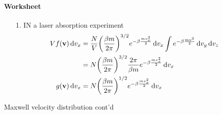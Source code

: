 \documentclass[../main.tex]{subfiles}
\begin{document}
\paragraph{Worksheet}
\begin{enumerate}
    \item [1.] IN a laser absorption experiment
    \begin{align*}
        V f(\vb v) \dd{v_x} &= \frac{N}{V} \qt(\frac{\beta m}{2\pi})^{3/2} e^{-\beta \frac{m v_x^2}{2}} \dd{v_x} \int  e^{-\beta \frac{m v^2}{2}} \dd{v_y} \dd{v_z}\\
        &= N \qt(\frac{\beta m}{2\pi})^{3/2} \frac{2\pi}{\beta m} e^{-\beta \frac{mv_x^2}{2}} \dd{v_x} \\
        g(\vb v) \dd{v_x} &=  N \qt(\frac{\beta m}{2\pi})^{1/2} e^{-\beta \frac{m v_x^2}{2}} \dd{v_x}
    \end{align*}
\end{enumerate}

\newpage
{}

Maxwell velocity distribution cont'd
\end{document}
